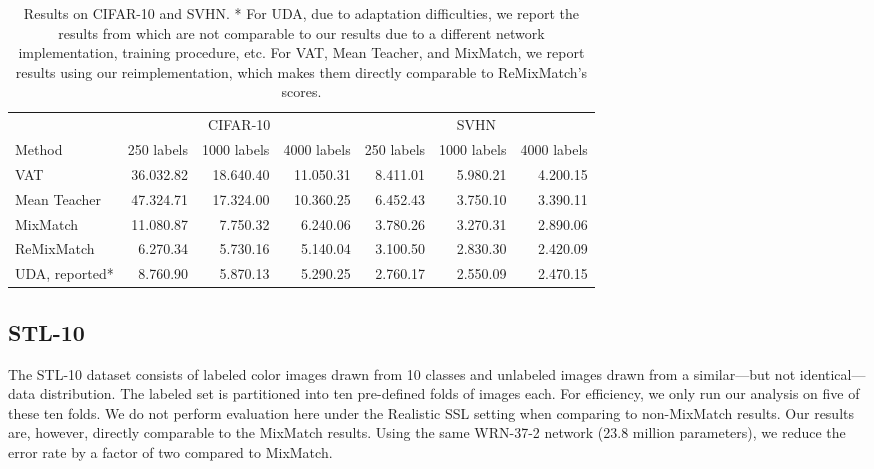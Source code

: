 \documentclass{article} \usepackage{iclr2020_conference,times}
\begin{document}
\begin{table}[h]
    \centering
    \footnotesize
    \begin{tabular}{lrrrrrr}
    \toprule
        & \multicolumn{3}{c}{CIFAR-10} & \multicolumn{3}{c}{SVHN} \\
        \cmidrule(l{3pt}r{3pt}){1-1} \cmidrule(l{3pt}r{3pt}){2-4}  \cmidrule(l{3pt}r{3pt}){5-7}
        Method & 250 labels & 1000 labels & 4000 labels & 250 labels & 1000 labels & 4000 labels \\
        \cmidrule(l{3pt}r{3pt}){1-1} \cmidrule(l{3pt}r{3pt}){2-4}  \cmidrule(l{3pt}r{3pt}){5-7}
        VAT &  36.032.82 & 18.640.40 & 11.050.31 &  8.411.01 & 5.980.21 & 4.200.15 \\
        Mean Teacher  & 47.324.71 & 17.324.00 & 10.360.25 &  6.452.43 & 3.750.10 & 3.390.11 \\
        MixMatch & 11.080.87 & 7.750.32 & 6.240.06 & 3.780.26 & 3.270.31 & 2.890.06 \\
        ReMixMatch & 6.270.34 & 5.730.16 & 5.140.04 &  3.100.50 & 2.830.30 & 2.420.09 \\
        \cmidrule(l{3pt}r{3pt}){1-1} \cmidrule(l{3pt}r{3pt}){2-4}  \cmidrule(l{3pt}r{3pt}){5-7}
        UDA, reported* & 8.760.90 & 5.870.13 & 5.290.25 & 2.760.17 & 2.550.09 & 2.470.15 \\
        \bottomrule
    \end{tabular}
    \caption{Results on CIFAR-10 and SVHN.
    * For UDA, due to adaptation difficulties, we report the results from \cite{xie2019unsupervised} which are not comparable to our results due to a different network implementation, training procedure, etc.
    For VAT, Mean Teacher, and MixMatch, we report results using our reimplementation, which makes them directly comparable to ReMixMatch's scores.
    }
    \label{tab:realistic_ssl}
\end{table}

\subsection{STL-10}

The STL-10 dataset consists of  labeled  color images
drawn from 10 classes and  unlabeled images drawn from a similar---but not identical---data distribution.
The labeled set is partitioned into ten pre-defined folds of  images
each. For efficiency, we only run our analysis on five of these ten folds.
We do not perform evaluation here under the Realistic SSL \citep{oliver2018realistic} setting when
comparing to non-MixMatch results.
Our results are, however, directly comparable to the MixMatch results.
Using the same WRN-37-2 network (23.8 million parameters), we reduce the error rate by a factor of two compared to MixMatch.
\end{document}
